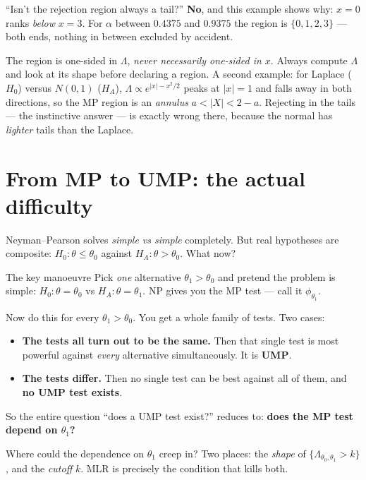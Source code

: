 \documentclass[11pt]{article}
\begin{document}
\begin{confusion}{``Isn't the rejection region always a tail?''}
\textbf{No}, and this example shows why: $x=0$ ranks \emph{below} $x=3$. For
$\alpha$ between $0.4375$ and $0.9375$ the region is $\{0,1,2,3\}$ --- both ends, nothing in
between excluded by accident.

The region is one-sided in $\Lambda$, \emph{never necessarily one-sided in $x$}. Always
compute $\Lambda$ and look at its shape before declaring a region. A second example: for
Laplace ($H_0$) versus $N(0,1)$ ($H_A$), $\Lambda\propto e^{|x|-x^2/2}$ peaks at $|x|=1$ and
falls away in both directions, so the MP region is an \emph{annulus} $a<|X|<2-a$. Rejecting in
the tails --- the instinctive answer --- is exactly wrong there, because the normal has
\emph{lighter} tails than the Laplace.
\end{confusion}

\section{From MP to UMP: the actual difficulty}

Neyman--Pearson solves \emph{simple vs simple} completely. But real hypotheses are composite:
$H_0:\theta\le\theta_0$ against $H_A:\theta>\theta_0$. What now?

\begin{idea}{The key manoeuvre}
Pick \emph{one} alternative $\theta_1>\theta_0$ and pretend the problem is simple:
$H_0:\theta=\theta_0$ vs $H_A:\theta=\theta_1$. NP gives you the MP test --- call it
$\phi_{\theta_1}$.

Now do this for every $\theta_1>\theta_0$. You get a whole family of tests. Two cases:
\begin{itemize}
\item \textbf{The tests all turn out to be the same.} Then that single test is most powerful
against \emph{every} alternative simultaneously. It is \textbf{UMP}.
\item \textbf{The tests differ.} Then no single test can be best against all of them, and
\textbf{no UMP test exists}.
\end{itemize}
So the entire question ``does a UMP test exist?'' reduces to:
\textbf{does the MP test depend on $\theta_1$?}
\end{idea}

Where could the dependence on $\theta_1$ creep in? Two places: the \emph{shape} of
$\{\Lambda_{\theta_0,\theta_1}>k\}$, and the \emph{cutoff} $k$. MLR is precisely the condition
that kills both.
\end{document}
